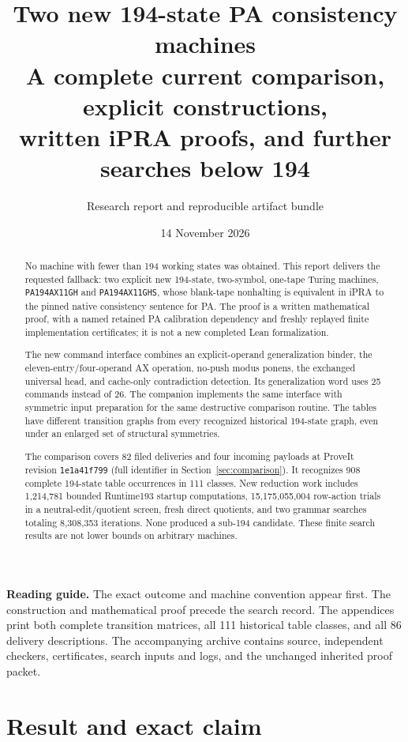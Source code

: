 \documentclass[10pt,a4paper]{article}
\title{\LARGE\bfseries Two new 194-state PA consistency machines\\[5pt]
\large A complete current comparison, explicit constructions,\\written iPRA proofs, and further searches below 194}
\author{Research report and reproducible artifact bundle}
\date{14 November 2026}
\newcommand{\GH}{\texttt{PA194AX11GH}}
\newcommand{\GHS}{\texttt{PA194AX11GHS}}
\begin{document}
\maketitle
\begin{abstract}
No machine with fewer than 194 working states was obtained. This report
delivers the requested fallback: two explicit new 194-state, two-symbol,
one-tape Turing machines, \GH{} and \GHS{}, whose blank-tape nonhalting
is equivalent in iPRA to the pinned native consistency sentence for PA.
The proof is a written mathematical proof, with a named retained PA
calibration dependency and freshly replayed finite implementation
certificates; it is not a new completed Lean formalization.

The new command interface combines an explicit-operand generalization
binder, the eleven-entry/four-operand AX operation, no-push modus ponens,
the exchanged universal head, and cache-only contradiction detection.
Its generalization word uses 25 commands instead of 26. The companion
implements the same interface with symmetric input preparation for
the same destructive comparison routine.
The tables have different transition graphs from every recognized
historical 194-state graph, even under an enlarged set of structural
symmetries.

The comparison covers 82 filed deliveries and four incoming payloads at
ProveIt revision \texttt{1e1a41f799} (full identifier in Section~\ref{sec:comparison}).
It recognizes 908 complete 194-state table occurrences in 111 classes.
New reduction work includes 1,214,781 bounded Runtime193 startup
computations, 15,175,055,004 row-action trials in a neutral-edit/quotient
screen, fresh direct quotients, and two grammar searches totaling
8,308,353 iterations. None produced a sub-194 candidate. These finite
search results are not lower bounds on arbitrary machines.
\end{abstract}
\vfill
\textbf{Reading guide.} The exact outcome and machine convention appear
first. The construction and mathematical proof precede the search record.
The appendices print both complete transition matrices, all 111 historical
table classes, and all 86 delivery descriptions. The accompanying archive
contains source, independent checkers, certificates, search inputs and
logs, and the unchanged inherited proof packet.
\clearpage
\tableofcontents
\clearpage

\section{Result and exact claim}
\label{sec:result}
\end{document}
